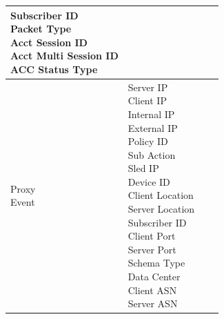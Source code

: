 \begin{description}
\begin{longtable}{p{}|p{}|p{}|p{}}
{                                                                                                            Subscriber ID\\
                                                                                                            Packet Type\\
                                                                                                            Acct Session ID\\
                                                                                                            Acct Multi Session ID\\
                                                                                                            ACC Status Type}    \\ \hline 
        \tabincell{l}{Proxy\\ Event} & \tabincell{l}{Server IP\\
                                                    Client IP\\
                                                    Internal IP\\
                                                    External IP\\
                                                    Policy ID\\
                                                    Sub Action\\
                                                    Sled IP\\
                                                    Device ID\\
                                                    Client Location\\
                                                    Server Location\\
                                                    Subscriber ID\\
                                                    Client Port\\
                                                    Server Port\\
                                                    Schema Type\\
                                                    Data Center\\
                                                    Client ASN\\
                                                    Server ASN\\
}
\end{longtable}
\end{description}
